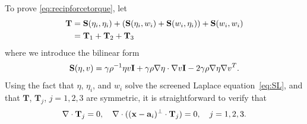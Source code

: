 \documentclass[lineno]{jfm}
\renewcommand{\aa}{\mathbf{a}}
\newcommand{\bd}{\partial}
\newcommand{\FF}{\mathbf{F}}
\newcommand{\JJ}{\mathbf{J}}
\newcommand{\nnu}{\boldsymbol{\nu}}
\newcommand{\ttau}{\boldsymbol{\tau}}
\renewcommand{\SS}{\mathbf{S}}
\newcommand{\xx}{\mathbf{x}}
\newcommand{\yy}{\mathbf{y}}
\newcommand{\pderiv}[2]{\frac{\partial #1}{\partial #2}}
\begin{document}

To prove \eqref{eq:recipforcetorque}, let 
\begin{align*}
  {\bf T} &=
    \SS(\eta _i,\eta _i) +(\SS(\eta _i,w_i) +\SS(w_i,\eta _i)) +\SS(w_i,w_i) \\
  &= {\bf T}_1 + {\bf T}_2 + {\bf T}_3
\end{align*}
where we introduce the bilinear form
\begin{equation}
\label{eq:Tsplit}
\SS(\eta ,v)
=  \gamma\rho^{-1} \eta v {\bf I} + \gamma\rho \nabla \eta  \cdot \nabla v {\bf I} - 2 \gamma \rho \nabla \eta  \nabla v^T.
\end{equation}
Using the fact that $\eta $,  $\eta _i$, and $w_i$ solve the screened Laplace
equation~\eqref{eq:SL}, and that $\mathbf{T}$, $\mathbf{T}_j$, $j = 1,
2, 3$ are symmetric, it is straightforward to verify that 
  \begin{equation}
    \label{eq:decompdivfree}
    \nabla \cdot {\bf T}_j = 0, \quad
    \nabla \cdot ((\xx-\aa_i)^{\perp} \cdot {\bf T}_j) = 0, \quad j = 1, 2, 3.
  \end{equation}
\end{document}
